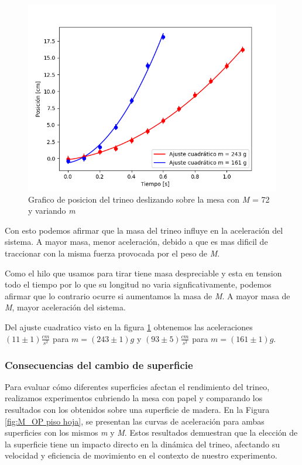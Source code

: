 \documentclass[12pt,a4]{article}
\begin{document}
\begin{figure}[H]
    \centering
    \includegraphics{ajuste2_PisoMaderaMPB_O.png}
    \caption{Grafico de posicion del trineo deslizando sobre la mesa con \textit{M} = 72 y variando \textit{m}}
    \label{fig:M_OP piso trineo}
\end{figure}

Con esto podemos afirmar que la masa del trineo influye en la aceleración del sistema. A mayor masa, menor aceleración, debido a que es mas dificil de traccionar con la misma fuerza provocada por el peso de \textit{M}. 

Como el hilo que usamos para tirar tiene masa despreciable y esta en tension todo el tiempo por lo que su longitud no varia signficativamente, podemos afirmar que lo contrario ocurre si aumentamos la masa de \textit{M}. A mayor masa de \textit{M}, mayor aceleración del sistema.

Del ajuste cuadratico visto en la figura \ref{fig:M_OP piso trineo} obtenemos las aceleraciones $(11 \pm 1) \frac{cm}{s^2}$ para $\textit{m} = (243 \pm 1) g$ y $(93 \pm 5) \frac{cm}{s^2}$ para $\textit{m} = (161 \pm 1) g$.

\subsubsection*{Consecuencias del cambio de superficie}

Para evaluar cómo diferentes superficies afectan el rendimiento del trineo, realizamos experimentos cubriendo la mesa con papel y comparando los resultados con los obtenidos sobre una superficie de madera. En la Figura \ref{fig:M_OP piso hoja}, se presentan las curvas de aceleración para ambas superficies con los mismos \textit{m} y \textit{M}. Estos resultados demuestran que la elección de la superficie tiene un impacto directo en la dinámica del trineo, afectando su velocidad y eficiencia de movimiento en el contexto de nuestro experimento.
\end{document}
